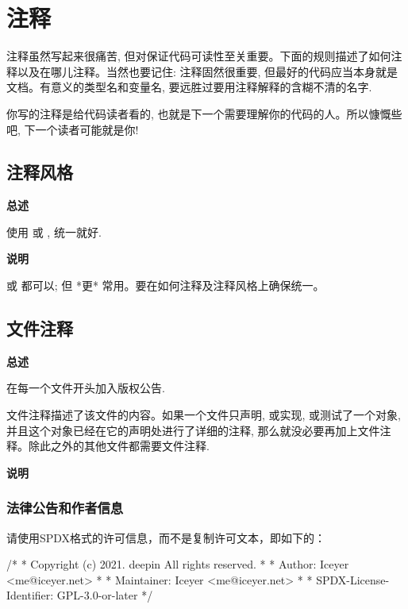\chapter{注释}

注释虽然写起来很痛苦, 但对保证代码可读性至关重要。下面的规则描述了如何注释以及在哪儿注释。当然也要记住: 注释固然很重要, 但最好的代码应当本身就是文档。有意义的类型名和变量名, 要远胜过要用注释解释的含糊不清的名字.

你写的注释是给代码读者看的, 也就是下一个需要理解你的代码的人。所以慷慨些吧, 下一个读者可能就是你!

\section{注释风格}

\textbf{总述}

使用 \cppinline{//} 或 \cppinline{/* */}, 统一就好.

\textbf{说明}

\cppinline{//} 或 \cppinline{/* */} 都可以; 但 \cppinline{//} *更* 常用。要在如何注释及注释风格上确保统一。

\section{文件注释}

\textbf{总述}

在每一个文件开头加入版权公告.

文件注释描述了该文件的内容。如果一个文件只声明, 或实现, 或测试了一个对象, 并且这个对象已经在它的声明处进行了详细的注释, 那么就没必要再加上文件注释。除此之外的其他文件都需要文件注释.

\textbf{说明}

\subsection{法律公告和作者信息}

请使用SPDX格式的许可信息，而不是复制许可文本，即如下的：

\begin{cppcode}
/*
* Copyright (c) 2021. deepin All rights reserved.
*
* Author:     Iceyer <me@iceyer.net>
*
* Maintainer: Iceyer <me@iceyer.net>
*
* SPDX-License-Identifier: GPL-3.0-or-later
*/
\end{cppcode}

